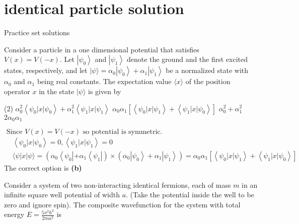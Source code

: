 \chapter{identical particle solution}
\begin{abox}
	Practice set solutions
	\end{abox}
\begin{enumerate}
\begin{minipage}{\textwidth}
	\item Consider a particle in a one dimensional potential that satisfies $V(x)=V(-x) .$ Let $\left|\psi_{0}\right\rangle$ and $\left|\psi_{1}\right\rangle$ denote the ground and the first excited states, respectively, and let $|\psi\rangle=\alpha_{0}\left|\psi_{0}\right\rangle+\alpha_{1}\left|\psi_{1}\right\rangle$ be a normalized state with $\alpha_{0}$ and $\alpha_{1}$ being real constants. The expectation value $\langle x\rangle$ of the position operator $x$ in the state $|\psi\rangle$ is given by
\end{minipage}
\begin{tasks}(2)
	\task[\textbf{A.}] $\alpha_{0}^{2}\left\langle\psi_{0}|x| \psi_{0}\right\rangle+\alpha_{1}^{2}\left\langle\psi_{1}|x| \psi_{1}\right\rangle$
	\task[\textbf{B.}]$\alpha_{0} \alpha_{1}\left[\left\langle\psi_{0}|x| \psi_{1}\right\rangle+\left\langle\psi_{1}|x| \psi_{0}\right\rangle\right]$
	\task[\textbf{C.}]$\alpha_{0}^{2}+\alpha_{1}^{2}$
	\task[\textbf{D.}]$2 \alpha_{0} \alpha_{1}$
\end{tasks}
\begin{answer}
	$\text { Since } V(x)=V(-x) \text { so potential is symmetric. }$\\
	\begin{align*}
		&\left\langle\psi_{0}|x| \psi_{0}\right\rangle=0,\left\langle\psi_{1}|x| \psi_{1}\right\rangle=0 \\
		&\langle\psi|x| \psi\rangle=\left(\alpha _ { 0 } \left\langle\psi_{0}\left|+\alpha_{1}\left\langle\psi_{1}\right|\right) \times\left(\alpha_{0}\left|\psi_{0}\right\rangle+\alpha_{1}\left|\psi_{1}\right\rangle\right)=\alpha_{0} \alpha_{1}\left[\left\langle\psi_{0}|x| \psi_{1}\right\rangle+\left\langle\psi_{1}|x| \psi_{0}\right\rangle\right]\right.\right.
	\end{align*}
	The correct option is \textbf{(b)}
\end{answer}
\begin{minipage}{\textwidth}
	\item Consider a system of two non-interacting identical fermions, each of mass $m$ in an infinite square well potential of width $a$. (Take the potential inside the well to be zero and ignore spin). The composite wavefunction for the system with total energy $E=\frac{5 \pi^{2} \hbar^{2}}{2 m a^{2}}$ is

\end{minipage}
\end{enumerate}
